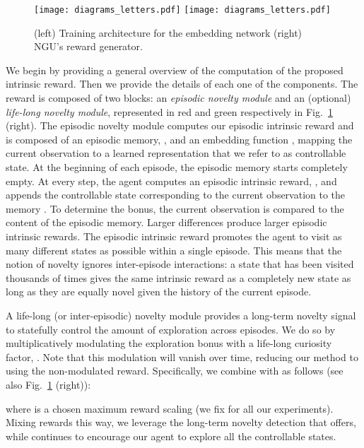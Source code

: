 \documentclass{article} \usepackage{iclr2020_conference,times}
\begin{document}
\begin{figure}[t!]
\centering
\texttt{[image: diagrams\_letters.pdf]}
\hfill
\vline
\hfill
\texttt{[image: diagrams\_letters.pdf]}
\caption{(left) Training architecture for the embedding network (right) NGU's reward generator.}
\label{overview_fig}
\vspace{-2ex}
\end{figure}

We begin by providing a general overview of the computation of the proposed intrinsic reward. Then we provide the details of each one of the components.
The reward is composed of two blocks: an \emph{episodic novelty module} and an (optional) \emph{life-long novelty module}, represented in red and green respectively in Fig.~\ref{overview_fig} (right).
The episodic novelty module computes our episodic intrinsic reward and is composed of an episodic memory, , and an embedding function , mapping the current observation to a learned representation that we refer to as controllable state. At the beginning of each episode, the episodic memory starts completely empty. At every step, the agent computes an episodic intrinsic reward, , and appends the controllable state corresponding to the current observation to the memory .
To determine the bonus, the current observation is compared to the content of the episodic memory. Larger differences produce larger episodic intrinsic rewards. 
The episodic intrinsic reward  promotes the agent to visit as many different states as possible within a single episode. This means that the notion of novelty ignores inter-episode interactions: a state that has been visited thousands of times gives the same intrinsic reward as a completely new state as long as they are equally novel given the history of the current episode.

A life-long (or inter-episodic) novelty module provides a long-term novelty signal to statefully control the amount of exploration across episodes. 
We do so by multiplicatively modulating the exploration bonus  with a life-long curiosity factor, . Note that this modulation will vanish over time, reducing our method to using the non-modulated reward. Specifically, we combine   with  as follows (see also Fig.~\ref{overview_fig} (right)):

where   is a chosen maximum reward scaling (we fix  for all our experiments). Mixing rewards this way, we leverage the long-term novelty detection that  offers, while  continues to encourage our agent to explore all the controllable states.
\end{document}
